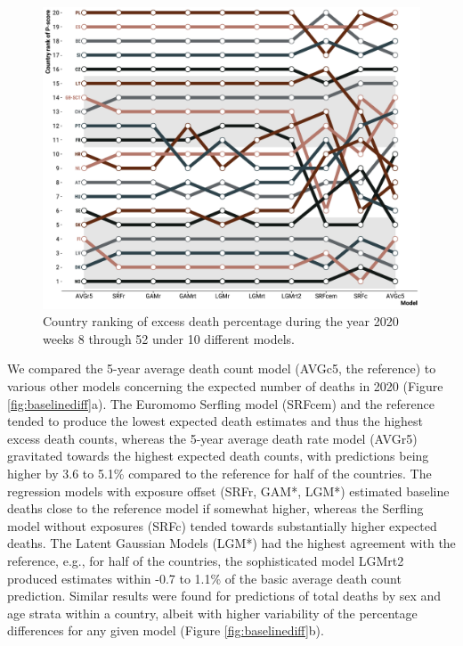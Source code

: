 \documentclass[12pt]{article}
\begin{document}
\begin{figure}
\caption{Country ranking of excess death percentage during the year 2020 weeks 8 through 52 under 10 different models.}
\label{fig:rank}
\includegraphics{rank.pdf}
\end{figure}

We compared the 5-year average death count model (AVGc5, the reference) to various other models concerning the expected number of deaths in 2020 (Figure \ref{fig:baselinediff}a). The Euromomo Serfling model (SRFcem) and the reference tended to produce the lowest expected death estimates and thus the highest excess death counts, whereas the 5-year average death rate model (AVGr5) gravitated towards the highest expected death counts, with predictions being higher by 3.6 to 5.1\% compared to the reference for half of the countries. The regression models with exposure offset (SRFr, GAM*, LGM*) estimated baseline deaths close to the reference model if somewhat higher, whereas the Serfling model without exposures (SRFc) tended towards substantially higher expected deaths. The Latent Gaussian Models (LGM*) had the highest agreement with the reference, e.g., for half of the countries, the sophisticated model LGMrt2 produced estimates within -0.7 to 1.1\% of the basic average death count prediction. Similar results were found for predictions of total deaths by sex and age strata within a country, albeit with higher variability of the percentage differences for any given model (Figure \ref{fig:baselinediff}b).
\end{document}
